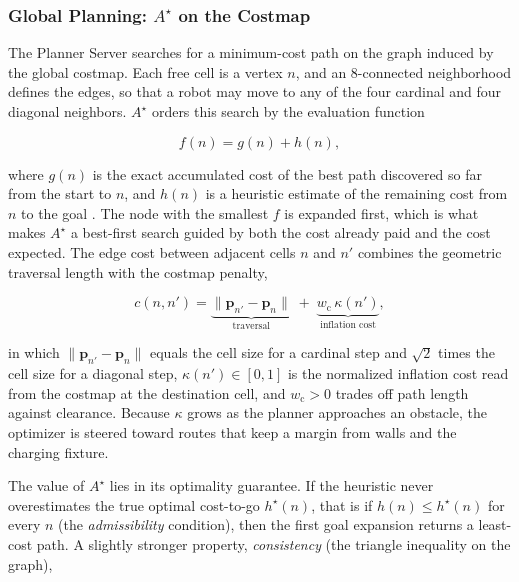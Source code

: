 \subsubsection{Global Planning: \texorpdfstring{$A^{\star}$}{A*} on the Costmap}\label{meth:sec:nav-global}

The Planner Server searches for a minimum-cost path on the graph induced by the global costmap.
Each free cell is a vertex $n$, and an $8$-connected neighborhood defines the edges, so that a
robot may move to any of the four cardinal and four diagonal neighbors. $A^{\star}$ orders this
search by the evaluation function

\begin{equation}\label{meth:eq:astar}
  f(n) = g(n) + h(n),
\end{equation}

where $g(n)$ is the exact accumulated cost of the best path discovered so far from the start to
$n$, and $h(n)$ is a heuristic estimate of the remaining cost from $n$ to the goal
\cite{hart1968astar}. The node with the smallest $f$ is expanded first, which is what makes
$A^{\star}$ a best-first search guided by both the cost already paid and the cost expected. The
edge cost between adjacent cells $n$ and $n'$ combines the geometric traversal length with the
costmap penalty,

\begin{equation}\label{meth:eq:cost-cell}
  c(n,n') = \underbrace{\lVert \mathbf{p}_{n'}-\mathbf{p}_{n}\rVert}_{\text{traversal}}
            \;+\; \underbrace{w_{\mathrm{c}}\,\kappa(n')}_{\text{inflation cost}},
\end{equation}

in which $\lVert\mathbf{p}_{n'}-\mathbf{p}_{n}\rVert$ equals the cell size for a cardinal step
and $\sqrt{2}$ times the cell size for a diagonal step, $\kappa(n')\in[0,1]$ is the normalized
inflation cost read from the costmap at the destination cell, and $w_{\mathrm{c}}>0$ trades off
path length against clearance. Because $\kappa$ grows as the planner approaches an obstacle, the
optimizer is steered toward routes that keep a margin from walls and the charging fixture.

The value of $A^{\star}$ lies in its optimality guarantee. If the heuristic never overestimates
the true optimal cost-to-go $h^{\star}(n)$, that is if $h(n)\le h^{\star}(n)$ for every $n$ (the
\emph{admissibility} condition), then the first goal expansion returns a least-cost path. A
slightly stronger property, \emph{consistency} (the triangle inequality on the graph),

